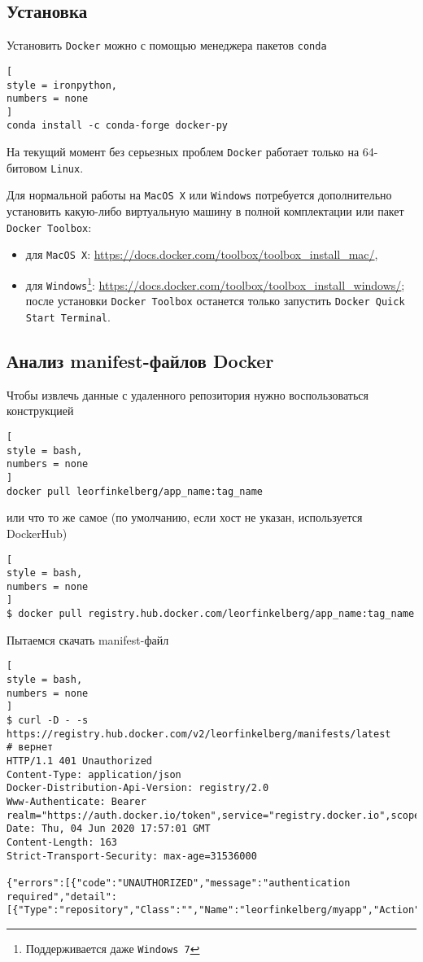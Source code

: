 \documentclass[%
	11pt,
	a4paper,
	utf8,
		]{article}
\begin{document}
\subsection{Установка}

Установить \texttt{Docker} можно с помощью менеджера пакетов \texttt{conda}

\begin{lstlisting}[
style = ironpython,
numbers = none
]
conda install -c conda-forge docker-py
\end{lstlisting}

На текущий момент без серьезных проблем \texttt{Docker} работает только на 64-битовом \texttt{Linux}.

Для нормальной работы на \texttt{MacOS X} или \texttt{Windows} потребуется дополнительно установить какую-либо виртуальную машину в полной комплектации или пакет \texttt{Docker Toolbox}:

\begin{itemize}
	\item для \texttt{MacOS X}: \url{https://docs.docker.com/toolbox/toolbox_install_mac/},
	
	\item для \texttt{Windows}\footnote{Поддерживается даже \texttt{Windows 7}}: \url{https://docs.docker.com/toolbox/toolbox_install_windows/}; после установки \texttt{Docker Toolbox} останется только запустить \texttt{Docker Quick Start Terminal}.
\end{itemize}

\subsection{Анализ manifest-файлов Docker}

Чтобы извлечь данные с удаленного репозитория нужно воспользоваться конструкцией
\begin{lstlisting}[
style = bash,
numbers = none
]
docker pull leorfinkelberg/app_name:tag_name
\end{lstlisting}
или что то же самое (по умолчанию, если хост не указан, используется DockerHub)
\begin{lstlisting}[
style = bash,
numbers = none
]
$ docker pull registry.hub.docker.com/leorfinkelberg/app_name:tag_name
\end{lstlisting}

Пытаемся скачать manifest-файл
\begin{lstlisting}[
style = bash,
numbers = none
]
$ curl -D - -s https://registry.hub.docker.com/v2/leorfinkelberg/manifests/latest
# вернет
HTTP/1.1 401 Unauthorized
Content-Type: application/json
Docker-Distribution-Api-Version: registry/2.0
Www-Authenticate: Bearer realm="https://auth.docker.io/token",service="registry.docker.io",scope="repository:leorfinkelberg/myapp:pull"
Date: Thu, 04 Jun 2020 17:57:01 GMT
Content-Length: 163
Strict-Transport-Security: max-age=31536000

{"errors":[{"code":"UNAUTHORIZED","message":"authentication required","detail":[{"Type":"repository","Class":"","Name":"leorfinkelberg/myapp","Action":"pull"}]}]}
\end{lstlisting}
\end{document}
